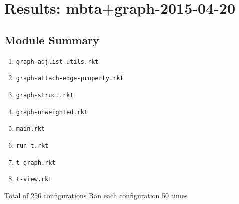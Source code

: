 \documentclass{article}
\newcommand{\mono}[1]{\texttt{#1}}
\begin{document}


\section{Results: mbta+graph-2015-04-20}

\subsection{Module Summary}
\begin{enumerate}
\item \mono{graph-adjlist-utils.rkt}
\item \mono{graph-attach-edge-property.rkt}
\item \mono{graph-struct.rkt}
\item \mono{graph-unweighted.rkt}
\item \mono{main.rkt}
\item \mono{run-t.rkt}
\item \mono{t-graph.rkt}
\item \mono{t-view.rkt}\end{enumerate}
Total of 256 configurations
Ran each configuration 50 times
\end{document}
